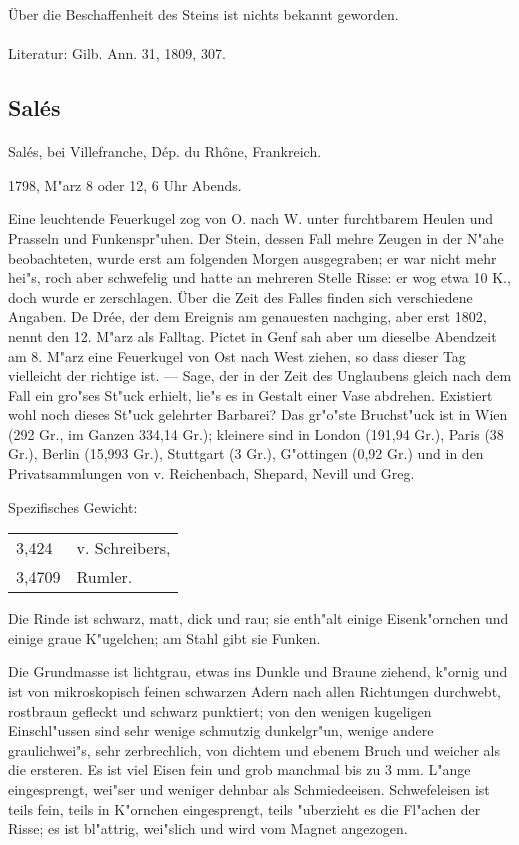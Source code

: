 \documentclass[a4paper, 11pt, oneside]{article}
\begin{document}
Über die Beschaffenheit des Steins ist nichts bekannt geworden.

\footnotesize
\paragraph{}
Literatur: Gilb. Ann. 31, 1809, 307.
\subsection{Salés}
\normalsize
\paragraph{}
Salés, bei Villefranche, Dép. du Rhône, Frankreich.

1798, M"arz 8 oder 12, 6 Uhr Abends.

Eine leuchtende Feuerkugel zog von O. nach W. unter furchtbarem Heulen und Prasseln und Funkenspr"uhen. Der Stein, dessen Fall mehre Zeugen in der N"ahe beobachteten, wurde erst am folgenden Morgen ausgegraben; er war nicht mehr hei"s, roch aber schwefelig und hatte an mehreren Stelle Risse: er wog etwa 10 K., doch wurde er zerschlagen. Über die Zeit des Falles finden sich verschiedene Angaben. De Drée, der dem Ereignis am genauesten nachging, aber erst 1802, nennt den 12. M"arz als Falltag. Pictet in Genf sah aber um dieselbe Abendzeit am 8. M"arz eine Feuerkugel von Ost nach West ziehen, so dass dieser Tag vielleicht der richtige ist. --- Sage, der in der Zeit des Unglaubens gleich nach dem Fall ein gro"ses St"uck erhielt, lie"s es in Gestalt einer Vase abdrehen. Existiert wohl noch dieses St"uck gelehrter Barbarei? Das gr"o"ste Bruchst"uck ist in Wien (292 Gr., im Ganzen 334,14 Gr.); kleinere sind in London (191,94 Gr.), Paris (38 Gr.), Berlin (15,993 Gr.), Stuttgart (3 Gr.), G"ottingen (0,92 Gr.) und in den Privatsammlungen von v. Reichenbach, Shepard, Nevill und Greg.

Spezifisches Gewicht:
\begin{table}[!ht]
    \centering
    \begin{tabular}{l l}
        3,424 & v. Schreibers,\\
        3,4709 & Rumler.
    \end{tabular}
\end{table}

Die Rinde ist schwarz, matt, dick und rau; sie enth"alt einige Eisenk"ornchen und einige graue K"ugelchen; am Stahl gibt sie Funken.

Die Grundmasse ist lichtgrau, etwas ins Dunkle und Braune ziehend, k"ornig und ist von mikroskopisch feinen schwarzen Adern nach allen Richtungen durchwebt, rostbraun gefleckt und schwarz punktiert; von den wenigen kugeligen Einschl"ussen sind sehr wenige schmutzig dunkelgr"un, wenige andere graulichwei"s, sehr zerbrechlich, von dichtem und ebenem Bruch und weicher als die ersteren. Es ist viel Eisen fein und grob manchmal bis zu 3 mm. L"ange eingesprengt, wei"ser und weniger dehnbar als Schmiedeeisen. Schwefeleisen ist teils fein, teils in K"ornchen eingesprengt, teils "uberzieht es die Fl"achen der Risse; es ist bl"attrig, wei"slich und wird vom Magnet angezogen.
\end{document}

